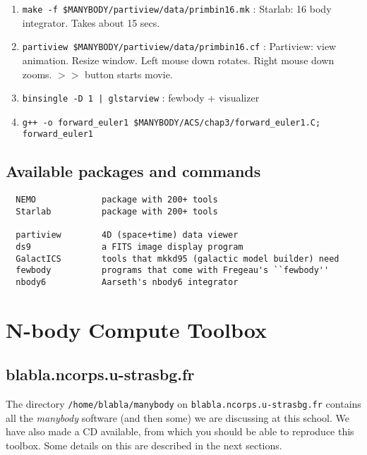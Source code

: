 \begin{enumerate}
\item
{\tt make -f \$MANYBODY/partiview/data/primbin16.mk} : Starlab: 16 body integrator. Takes about 15 secs.

\item
{\tt partiview  \$MANYBODY/partiview/data/primbin16.cf} : Partiview: view animation. Resize window.
Left mouse down rotates. Right mouse down zooms. $>>$ button starts movie.

\item
{\tt binsingle -D 1 | glstarview} : fewbody + visualizer

\item
{\tt g++ -o forward\_euler1 \$MANYBODY/ACS/chap3/forward\_euler1.C; forward\_euler1} 


\end{enumerate}

\section{Available packages and commands}

\begin{verbatim}
  NEMO             package with 200+ tools
  Starlab          package with 200+ tools

  partiview        4D (space+time) data viewer
  ds9              a FITS image display program
  GalactICS        tools that mkkd95 (galactic model builder) need
  fewbody          programs that come with Fregeau's ``fewbody''
  nbody6           Aarseth's nbody6 integrator
\end{verbatim}


\chapter                {N-body Compute Toolbox}

\section{blabla.ncorps.u-strasbg.fr}

The directory {\tt /home/blabla/manybody} on  {\tt blabla.ncorps.u-strasbg.fr} 
contains all the {\it manybody} software (and then some)  
we are discussing at this school. We have
also made a CD available, from which you should be able to reproduce this
toolbox. Some details on this are described in the next sections.

